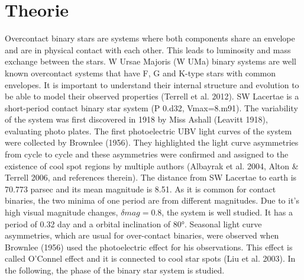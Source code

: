 \section{Theorie}
\label{sec:Theorie}

Overcontact binary stars are systems where both components share an envelope and 
are in physical contact with each other. This leads to luminosity and mass exchange 
between the stars. W Ursae Majoris (W UMa) binary systems are well known overcontact 
systems that have F, G and K-type stars with common envelopes. It is important to 
understand their internal structure and evolution to be able to model their observed 
properties (Terrell et al. 2012). SW Lacertae is a short-period contact binary star 
system (P 0.d32, Vmax=8.m91). The variability of the system was first discovered in 
1918 by Miss Ashall (Leavitt 1918), evaluating photo plates. The first photoelectric 
UBV light curves of the system were collected by Brownlee (1956). They highlighted the 
light curve asymmetries from cycle to cycle and these asymmetries were confirmed and 
assigned to the existence of cool spot regions by multiple authors (Albayrak et al. 
2004, Alton \& Terrell 2006, and references therein). The distance from SW Lacertae to 
earth is 70.773 parsec and its mean magnitude is 8.51. As it is common for contact 
binaries, the two minima of one period are from different magnitudes. Due to it’s 
high visual magnitude changes, $\delta mag = 0.8$, the system is well studied. It has a 
period of 0.32 day and a orbital inclination of 80°. Seasonal light curve asymmetries,
 which are usual for over-contact binaries, were observed when Brownlee (1956) used the
  photoelectric effect for his observations. This effect is called O’Connel effect and 
  it is connected to cool star spots (Liu et al. 2003). 
In the following, the phase of the binary star system is studied.    